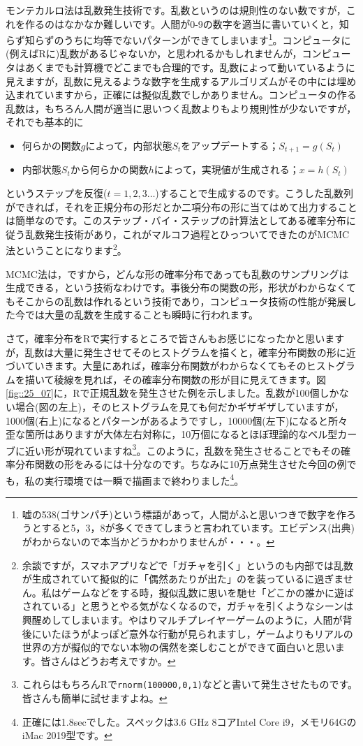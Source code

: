 \documentclass{ltjsarticle}
\begin{document}
モンテカルロ法は乱数発生技術です。乱数というのは規則性のない数ですが，これを作るのはなかなか難しいです。人間が0-9の数字を適当に書いていくと，知らず知らずのうちに均等でないパターンができてしまいます\footnote{嘘の538(ゴサンパチ)という標語があって，人間がふと思いつきで数字を作ろうとすると5，3，8が多くできてしまうと言われています。エビデンス(出典)がわからないので本当かどうかわかりませんが・・・。}。コンピュータに(例えばRに)乱数があるじゃないか，と思われるかもしれませんが，コンピュータはあくまでも計算機でどこまでも合理的です。乱数によって動いているように見えますが，乱数に見えるような数字を生成するアルゴリズムがその中には埋め込まれていますから，正確には擬似乱数でしかありません。コンピュータの作る乱数は，もちろん人間が適当に思いつく乱数よりもより規則性が少ないですが，それでも基本的に
\begin{itemize}
    \item 何らかの関数$g$によって，内部状態$S_t$をアップデートする；$S_{t+1}=g(S_t)$
    \item 内部状態$S_t$から何らかの関数$h$によって，実現値が生成される；$x = h(S_t)$
\end{itemize}
というステップを反復($t=1,2,3\ldots$)することで生成するのです。こうした乱数列ができれば，それを正規分布の形だとか二項分布の形に当てはめて出力することは簡単なのです。このステップ・バイ・ステップの計算法としてある確率分布に従う乱数発生技術があり，これがマルコフ過程とひっついてできたのがMCMC法ということになります\footnote{余談ですが，スマホアプリなどで「ガチャを引く」というのも内部では乱数が生成されていて擬似的に「偶然あたりが出た」のを装っているに過ぎません。私はゲームなどをする時，擬似乱数に思いを馳せ「どこかの誰かに遊ばされている」と思うとやる気がなくなるので，ガチャを引くようなシーンは興醒めしてしまいます。やはりマルチプレイヤーゲームのように，人間が背後にいたほうがよっぽど意外な行動が見られますし，ゲームよりもリアルの世界の方が擬似的でない本物の偶然を楽しむことができて面白いと思います。皆さんはどうお考えですか。}。

MCMC法は，ですから，どんな形の確率分布であっても乱数のサンプリングは生成できる，という技術なわけです。事後分布の関数の形，形状がわからなくてもそこからの乱数は作れるという技術であり，コンピュータ技術の性能が発展した今では大量の乱数を生成することも瞬時に行われます。

さて，確率分布をRで実行するところで皆さんもお感じになったかと思いますが，乱数は大量に発生させてそのヒストグラムを描くと，確率分布関数の形に近づいていきます。大量にあれば，確率分布関数がわからなくてもそのヒストグラムを描いて稜線を見れば，その確率分布関数の形が目に見えてきます。図\ref{fig::25_07}に，Rで正規乱数を発生させた例を示しました。乱数が100個しかない場合(図の左上)，そのヒストグラムを見ても何だかギザギザしていますが，1000個(右上)になるとパターンがあるようですし，10000個(左下)になると所々歪な箇所はありますが大体左右対称に，10万個になるとほぼ理論的なベル型カーブに近い形が現れていますね\footnote{これらはもちろんRで\texttt{rnorm(100000,0,1)}などと書いて発生させたものです。皆さんも簡単に試せますよね。}。このように，乱数を発生させることでもその確率分布関数の形をみるには十分なのです。ちなみに10万点発生させた今回の例でも，私の実行環境では一瞬で描画まで終わりました\footnote{正確には1.8secでした。スペックは3.6 GHz 8コアIntel Core i9，メモリ64GのiMac 2019型です。}。
\end{document}
